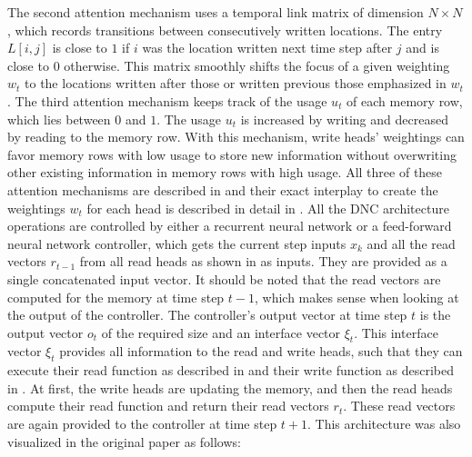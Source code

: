 \documentclass[draft,final]{vutinfth} %
\begin{document}
    The second attention mechanism uses a temporal link matrix of dimension $N \times N$, which records transitions between consecutively written locations.
    The entry $L[i,j]$ is close to $1$ if $i$ was the location written next time step after $j$ and is close to $0$ otherwise.
    This matrix smoothly shifts the focus of a given weighting $w_t$ to the locations written after those or written previous those emphasized in $w_t$.
    The third attention mechanism keeps track of the usage $u_t$ of each memory row, which lies between $0$ and $1$.
    The usage $u_t$ is increased by writing and decreased by reading to the memory row.
    With this mechanism, write heads' weightings can favor memory rows with low usage to store new information without overwriting other existing information in memory rows with high usage.
    All three of these attention mechanisms are described in \cite[p. 1-2]{DNC} and their exact interplay to create the weightings $w_t$ for each head is described in detail in \cite[p. 7-8]{DNC}.
    All the DNC architecture operations are controlled by either a recurrent neural network or a feed-forward neural network controller, which gets the current step inputs $x_k$ and all the read vectors $r_{t-1}$ from all read heads as shown in  as inputs.
    They are provided as a single concatenated input vector.
    It should be noted that the read vectors are computed for the memory at time step $t-1$, which makes sense when looking at the output of the controller.
    The controller's output vector at time step $t$ is the output vector $o_t$ of the required size and an interface vector $\xi_t$.
    This interface vector $\xi_t$ provides all information to the read and write heads, such that they can execute their read function as described in  and their write function as described in .
    At first, the write heads are updating the memory, and then the read heads compute their read function and return their read vectors $r_t$.
    These read vectors are again provided to the controller at time step $t+1$.
    This architecture was also visualized in the original paper as follows:
\end{document}
